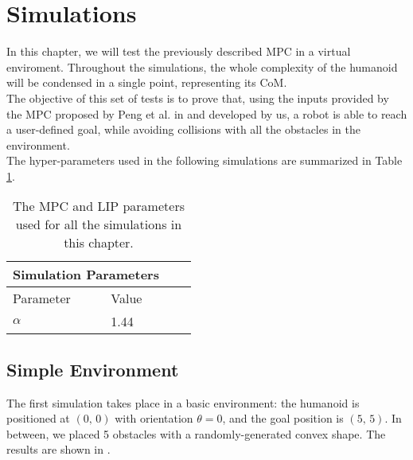 \documentclass[main.tex]{subfiles}
\begin{document}
\section{Simulations}\label{sec:simulations}

In this chapter, we will test the previously described MPC in a virtual enviroment. Throughout the simulations, the whole complexity of the humanoid will be condensed in a single point, representing its CoM.\\
The objective of this set of tests is to prove that, using the inputs provided by the MPC proposed by Peng et al. in \cite{peng_main_paper} and developed by us, a robot is able to reach a user-defined goal, while avoiding collisions with all the obstacles in the environment.\\
The hyper-parameters used in the following simulations are summarized in Table \ref{table:sim_params}.

\begin{table}[h]
        \begin{tabular}{ |p{3cm}||p{3cm}|p{3cm}|p{3cm}|  }
             \hline
             \multicolumn{2}{|c|}{Simulation Parameters} \\
             \hline
             Parameter& Value\\
             \hline
             $\alpha$   & 1.44 \\
             \hline
        \end{tabular}
    \centering
    \caption{The MPC and LIP parameters used for all the simulations in this chapter. }
    \label{table:sim_params}
\end{table}

\subsection{Simple Environment}
The first simulation takes place in a basic environment: the humanoid is positioned at $(0,\,0)$ with orientation $\theta = 0$, and the goal position is $(5,\,5)$. In between, we placed 5 obstacles with a randomly-generated convex shape. The results are shown in . %
\end{document}
